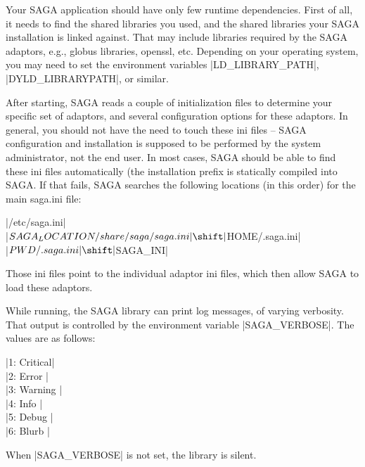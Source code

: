  Your SAGA application should have only few runtime
 dependencies.  First of all, it needs to find the shared
 libraries you used, and the shared libraries your SAGA
 installation is linked against.  That may include libraries
 required by the SAGA adaptors, e.g., globus libraries, openssl,
 etc.  Depending on your operating system, you may need to set
 the environment variables |LD_LIBRARY_PATH|,
 |DYLD_LIBRARYPATH|, or similar.

 After starting, SAGA reads a couple of initialization
 files to determine your specific set of adaptors, and several
 configuration options for these adaptors.  In general, you
 should not have the need to touch these ini files -- SAGA configuration
 and installation is supposed to be performed by the system
 administrator, not the end user.  In most cases, SAGA should be
 able to find these ini files automatically (the installation
 prefix is statically compiled into SAGA.  If that fails, SAGA
 searches the following locations (in this order) for the main
 saga.ini file:

    \shift |/etc/saga.ini|\\
    \shift |$SAGA_LOCATION/share/saga/saga.ini|\\
    \shift |$HOME/.saga.ini|\\
    \shift |$PWD/.saga.ini|\\
    \shift |$SAGA_INI|
 
 Those ini files point to the individual adaptor ini files,
 which then allow SAGA to load these adaptors.

 While running, the SAGA library can print log messages, of
 varying verbosity.  That output is controlled by the
 environment variable |SAGA_VERBOSE|.  The values are as
 follows:

   \shift |1: Critical|\\
   \shift |2: Error   |\\
   \shift |3: Warning |\\
   \shift |4: Info    |\\
   \shift |5: Debug   |\\
   \shift |6: Blurb   |
   
 When |SAGA_VERBOSE| is not set, the library is silent.

